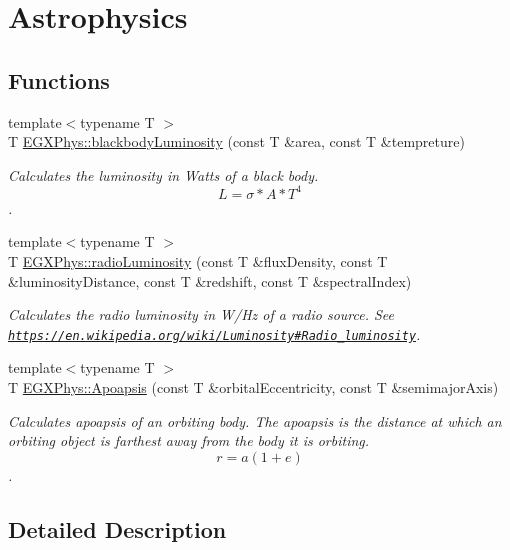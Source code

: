 \hypertarget{group___astrophysics}{}\section{Astrophysics}
\label{group___astrophysics}
\subsection*{Functions}
\begin{DoxyCompactItemize}
\item 
{\footnotesize template$<$typename T $>$ }\\T \hyperlink{group___astrophysics_ga909f82edfaed449b44e94788b642ebb8}{E\+G\+X\+Phys\+::blackbody\+Luminosity} (const T \&area, const T \&tempreture)
\begin{DoxyCompactList}\small\item\em Calculates the luminosity in Watts of a black body. \[L=\sigma*A*T^4\]. \end{DoxyCompactList}\item 
{\footnotesize template$<$typename T $>$ }\\T \hyperlink{group___astrophysics_ga6d6865b2aac1bc7c7f06b7c4ac2444e4}{E\+G\+X\+Phys\+::radio\+Luminosity} (const T \&flux\+Density, const T \&luminosity\+Distance, const T \&redshift, const T \&spectral\+Index)
\begin{DoxyCompactList}\small\item\em Calculates the radio luminosity in W/\+Hz of a radio source. See \href{https://en.wikipedia.org/wiki/Luminosity#Radio_luminosity}{\tt https\+://en.\+wikipedia.\+org/wiki/\+Luminosity\#\+Radio\+\_\+luminosity}. \end{DoxyCompactList}\item 
{\footnotesize template$<$typename T $>$ }\\T \hyperlink{group___astrophysics_gaf962e650bf84a568458e8eb39b1c61ba}{E\+G\+X\+Phys\+::\+Apoapsis} (const T \&orbital\+Eccentricity, const T \&semimajor\+Axis)
\begin{DoxyCompactList}\small\item\em Calculates apoapsis of an orbiting body. The apoapsis is the distance at which an orbiting object is farthest away from the body it is orbiting. \[r=a(1+e)\]. \end{DoxyCompactList}\end{DoxyCompactItemize}


\subsection{Detailed Description}


